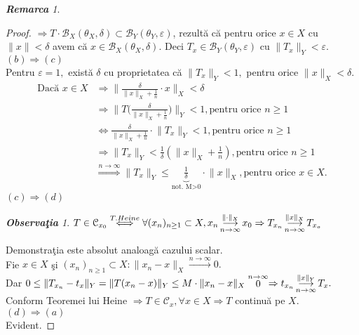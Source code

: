 \documentclass[ a4paper, 12pt]{report}
\theoremstyle{definition}
\theoremstyle{remark}
\newtheorem{remarc}{\bf Remarca}[section]
\newtheorem{obs}{\bf Observa\c tia }[section]
\numberwithin{equation}{section}
\begin{document}
\begin{remarc}
\begin{proof}
$\Rightarrow T \cdot \mathcal{B}_{X}(\theta_{X}, \delta) \subset \mathcal{B}_{Y}(\theta_{Y}, \varepsilon)$, rezult\u a c\u a pentru orice $x \in X$ cu $\lVert x \rVert < \delta$ avem c\u a $x \in \mathcal{B}_{X}(\theta_{X}, \delta)$. Deci $T_{x} \in \mathcal{B}_{Y}(\theta_{Y}, \varepsilon)$ cu $\lVert T_{x} \rVert_{Y}< \varepsilon.$\\
$(b) \Longrightarrow (c)$\\
Pentru $\varepsilon =1,$ exist\u a $\delta$ cu proprietatea c\u a $\lVert T_x \rVert_{Y}<1,$ pentru orice $\lVert x \rVert_{X} < \delta.$\\
\begin{align*}
\mbox{Dac\u a } x \in X &\Rightarrow \lVert \frac{\delta}{\lVert x \rVert_{X}+\frac{1}{n}}\cdot x \rVert_{X} < \delta \\&\Rightarrow \lVert T \Big(  \frac{\delta}{\lVert x \rVert_{X}+\frac{1}{n}} \Big) \rVert_{Y} < 1, \mbox{pentru orice } n \geq 1 \\&\Leftrightarrow \frac{\delta}{\lVert x \rVert_{X}+\frac{1}{n}} \cdot \lVert T_x \rVert_{Y} < 1, \mbox{pentru orice } n \geq 1 \\&\Rightarrow \lVert T_x \rVert_{Y} < \frac{1}{\delta} \left( \lVert x \rVert_{X} + \frac{1}{n} \right), \mbox{pentru orice } n \geq 1 \\&\stackrel{n \rightarrow \infty}{\Longrightarrow} \lVert T_x \rVert_{Y} \leq \underbrace{\frac{1}{\delta}}_\text{not. M>0}  \cdot \lVert x \rVert_{X}, \mbox{pentru orice } x \in X.
\end{align*}
$(c) \Longrightarrow (d)$\\
\begin{obs}
$T \in \mathcal{C}_{x_{0}} \stackrel{T. Heine}{\Longleftrightarrow} \forall (x_n)_{n \geq 1} \subset X, x_n \pound\limits_{n \rightarrow \infty}^{\lVert \cdot \rVert_{X}} x_0 \Rightarrow T_{x_{n}} \pound\limits_{n \rightarrow \infty}^{\lVert x \rVert_{X}} T_{x_{o}}$
\end{obs}
Demonstra\c tia este absolut analoag\u a cazului scalar.\\
Fie $x \in X$ \c si $(x_n)_{n \geq 1} \subset X: \lVert x_n - x \rVert_{X} \stackrel{n \rightarrow \infty}{\longrightarrow} 0.$\\
Dar $0 \leq \lVert T_{x_{n}} - t_x \rVert_{Y} = \lVert T(x_n - x) \rVert_{Y} \leq M \cdot \lVert x_n - x \rVert_{X} \stackrel{n \rightarrow \infty}{0} \Rightarrow t_{x_{n}} \pound\limits_{n \rightarrow \infty}^{\lVert x \rVert_{Y}} T_x.$\\
Conform Teoremei lui Heine $\Rightarrow T \in \mathcal{C}_{x}, \forall x \in X \Rightarrow T$ continu\u a pe $X$.\\
$(d)\Longrightarrow (a)$\\
Evident.
\end{proof}
\end{remarc}
\end{document}
